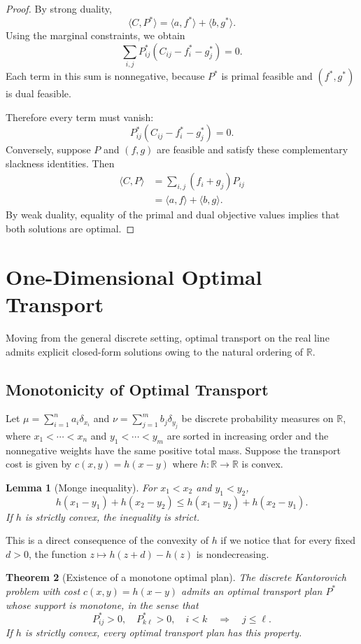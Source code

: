 \documentclass[11pt,a4paper]{article}
\newtheorem{theorem}{Theorem}[section]
\newtheorem{lemma}[theorem]{Lemma}
\theoremstyle{definition}
\begin{document}
\begin{proof}
By strong duality,
\[
\langle C,P^*\rangle=\langle a,f^*\rangle+\langle b,g^*\rangle.
\]
Using the marginal constraints, we obtain
\[
\sum_{i,j}P_{ij}^*(C_{ij}-f_i^*-g_j^*)=0.\]
Each term in this sum is nonnegative, because $P^*$ is primal feasible and $(f^*,g^*)$ is dual feasible.

Therefore every term must vanish:\[P_{ij}^*(C_{ij}-f_i^*-g_j^*)=0.\]
Conversely, suppose $P$ and $(f,g)$ are feasible and satisfy these complementary slackness identities.
Then
\[
\begin{aligned}
\langle C,P\rangle
&=\sum_{i,j}(f_i+g_j)P_{ij}\\
&=\langle a,f\rangle+\langle b,g\rangle.
\end{aligned}
\]
By weak duality, equality of the primal and dual objective values implies that both solutions are optimal.
\end{proof}

\section{One-Dimensional Optimal Transport}
Moving from the general discrete setting, optimal transport on the real line admits explicit closed-form solutions owing to the natural ordering of $\mathbb{R}$.
\subsection{Monotonicity of Optimal Transport}

Let $\mu=\sum_{i=1}^n a_i\delta_{x_i}$ and $\nu=\sum_{j=1}^m b_j\delta_{y_j}$ be discrete probability measures on $\mathbb{R}$,
where $x_1<\cdots<x_n$ and $y_1<\cdots<y_m$ are sorted in increasing order and the nonnegative
weights have the same positive total mass. Suppose the transport cost is given by $c(x,y)=h(x-y)$
where $h:\mathbb{R}\to\mathbb{R}$ is convex.
\begin{lemma}[Monge inequality]
\label{lem:monge-inequality}
For $x_1<x_2$ and $y_1<y_2$,
\[
h(x_1-y_1)+h(x_2-y_2)
\leq
h(x_1-y_2)+h(x_2-y_1).
\]
If $h$ is strictly convex, the inequality is strict.
\end{lemma}
This is a direct consequence of the convexity of $h$ if we notice that
for every fixed $d>0$, the function $z\longmapsto h(z+d)-h(z)$ is nondecreasing.

\begin{theorem}[Existence of a monotone optimal plan]
\label{thm:monotone-plan}
The discrete Kantorovich problem with cost $c(x,y)=h(x-y)$ admits an optimal
transport plan $P^*$ whose support is monotone, in the sense that
\[
P^*_{ij}>0,\quad P^*_{k\ell}>0,
\quad i<k
\quad\Longrightarrow\quad j\leq\ell.
\]
If $h$ is strictly convex, every optimal transport plan has this property.
\end{theorem}
\end{document}
